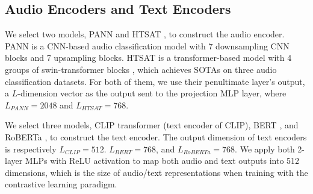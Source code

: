 \subsection{Audio Encoders and Text Encoders}\label{sec:at-encoder}
We select two models, PANN \cite{pann} and HTSAT \cite{hts-at}, to construct the audio encoder. PANN is a CNN-based \cite{cnn} audio classification model with 7 downsampling CNN blocks and 7 upsampling blocks. HTSAT is a transformer-based model with 4 groups of swin-transformer blocks \cite{swintransformer}, which achieves SOTAs on three audio classification datasets. For both of them, we use their penultimate layer's output, a $L$-dimension vector as the output sent to the projection MLP layer, where $L_{PANN}=2048$ and $L_{HTSAT}=768$.

We select three models, CLIP transformer \cite{clip} (text encoder of CLIP), BERT \cite{bert}, and RoBERTa \cite{roberta}, to construct the text encoder. The output dimension of text encoders is respectively $L_{CLIP}=512$. $L_{BERT}=768$, and $L_{RoBERTa}=768$. We apply both 2-layer MLPs with ReLU activation \cite{relu} to map both audio and text outputs into 512 dimensions, which is the size of audio/text representations when training with the contrastive learning paradigm.

